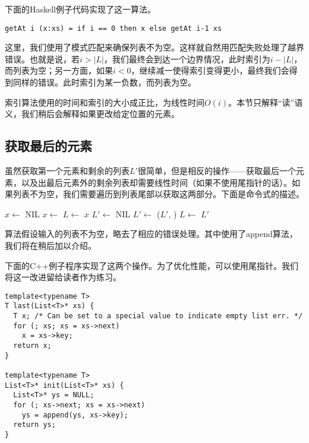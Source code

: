 \documentclass[UTF8]{article}
\begin{document}
下面的Haskell例子代码实现了这一算法。

\lstset{language=Haskell}
\begin{lstlisting}
getAt i (x:xs) = if i == 0 then x else getAt i-1 xs
\end{lstlisting}

这里，我们使用了模式匹配来确保列表不为空。这样就自然用匹配失败处理了越界错误。也就是说，若$i > |L|$，我们最终会到达一个边界情况，此时索引为$i - |L|$，而列表为空；另一方面，如果$i < 0$，继续减一使得索引变得更小，最终我们会得到同样的错误。此时索引为某一负数，而列表为空。

索引算法使用的时间和索引的大小成正比，为线性时间$O(i)$。本节只解释“读”语义，我们稍后会解释如果更改给定位置的元素。

\subsection{获取最后的元素}

虽然获取第一个元素和剩余的列表$L'$很简单，但是相反的操作——获取最后一个元素，以及出最后元素外的剩余列表却需要线性时间（如果不使用尾指针的话）。如果列表不为空，我们需要遍历到列表尾部以获取这两部分。下面是命令式的描述。

\begin{algorithmic}[1]
  \State $x \gets $ NIL
    \State $x \gets $ 
    \State $L \gets $ 
  \EndWhile
  \State \Return $x$
\EndFunction
\Statex
{}
  \State $L' \gets $ NIL
    \State $L' \gets$ ($L'$, )
    \State $L \gets $ 
  \EndWhile
  \State \Return $L'$
\EndFunction
\end{algorithmic}

算法假设输入的列表不为空，略去了相应的错误处理。其中使用了append算法，我们将在稍后加以介绍。

下面的C++例子程序实现了这两个操作。为了优化性能，可以使用尾指针。我们将这一改进留给读者作为练习。

\lstset{language=C++}
\begin{lstlisting}
template<typename T>
T last(List<T>* xs) {
  T x; /* Can be set to a special value to indicate empty list err. */
  for (; xs; xs = xs->next)
    x = xs->key;
  return x;
}

template<typename T>
List<T>* init(List<T>* xs) {
  List<T>* ys = NULL;
  for (; xs->next; xs = xs->next)
    ys = append(ys, xs->key);
  return ys;
}
\end{lstlisting}
\end{document}
